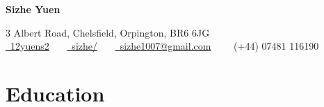 \documentclass{article}
\begin{document}
\pagestyle{empty} %


\par{\centering
		{\Large \textbf{Sizhe Yuen}
	}\par}

\begin{center}
3 Albert Road, Chelsfield, Orpington, BR6 6JG \\
\href{https://github.com/12yuens2}{\faGithub\ 12yuens2}
\ \ \ \href{https://www.linkedin.com/in/sizhe/}{\faLinkedin\ sizhe/}
\ \ \ \href{mailto:sizhe1007@gmail.com}{\faEnvelopeO\ sizhe1007@gmail.com}
\ \ \ \faMobile\ (+44) 07481 116190
\end{center}


\section*{Education}
\end{document}
